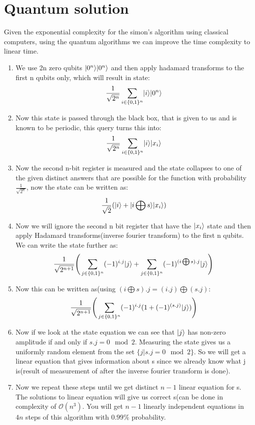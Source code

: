 \section{Quantum solution}
Given the exponential complexity for the simon's algorithm using classical computers, using the quantum algorithms we can improve the time complexity to linear time. \\
\begin{enumerate}
    \item We use 2n zero qubits $\lvert0^n\rangle\lvert0^n\rangle$ and then apply hadamard transforms to the first n qubits only, which will result in state:
    \begin{equation*}
        \frac{1}{\sqrt{2^n}} \sum_{i \in \{0,1\}^n} \lvert i\rangle\lvert0^n\rangle
    \end{equation*}
    \item Now this state is passed through the black box, that is given to us and is known to be periodic, this query turns this into:
    \begin{equation*}
        \frac{1}{\sqrt{2^n}} \sum_{i \in \{0,1\}^n} \lvert i\rangle\lvert x_i\rangle
    \end{equation*}
    \item Now the second n-bit register is measured and the state collapses to one of the given distinct answers that are possible for the function with probability $\frac{1}{\sqrt{2^n}}$, now the state can be written as:
    \begin{equation*}
        \frac{1}{\sqrt{2}}(\lvert i\rangle + \lvert i \bigoplus s\rangle \lvert x_i\rangle)
    \end{equation*}
    \item Now we will ignore the second n bit register that have the $\lvert x_i\rangle$ state and then apply Hadamard transforms(inverse fourier transform) to the first n qubits. We can write the state further as:
    \begin{equation*}
        \frac{1}{\sqrt{2^{n+1}}} \Bigg(\sum_{j\in\{0,1\}^n}(-1)^{i.j}\lvert j\rangle+\sum_{j\in\{0,1\}^n}(-1)^{(i\bigoplus s).j}\lvert j\rangle \Bigg)
    \end{equation*}
    \item Now this can be written as(using $(i\bigoplus s).j = (i.j)\bigoplus (s.j)$:
    \begin{equation*}
        \frac{1}{\sqrt{2^{n+1}}} \Bigg(\sum_{j\in\{0,1\}^n}(-1)^{i.j}(1+(-1)^{(s.j)}\lvert j\rangle) \Bigg)
    \end{equation*}
    \item Now if we look at the state equation we can see that $\lvert j\rangle$ has non-zero amplitude if and only if $s.j=0 \mod 2$. Measuring the state gives us a uniformly random element from the set $\{j | s.j = 0 \mod 2\}$. So we will get a linear equation that gives information about s since we already know what j is(result of measurement of after the inverse fourier transform is done).
    \item Now we repeat these steps until we get distinct $n-1$ linear equation for s. The solutions to linear equation will give us correct s(can be done in complexity of $\mathcal{O}(n^3)$. You will get $n-1$ linearly independent equations in $4n$ steps of this algorithm with $0.99\%$ probability.
\end{enumerate}

